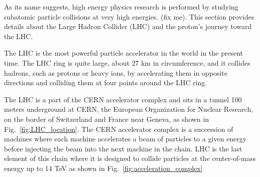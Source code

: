 
As its name suggests, high energy physics research is performed by studying subatomic particle collisions at very high energies. (fix me).
This section provides details about the Large Hadron Collider (LHC) and the proton's journey toward the LHC. %

The LHC is the most powerful particle accelerator in the world in the present time.
The LHC ring is quite large, about 27 km in circumference, and it collides hadrons, such as protons or heavy ions,
by accelerating them in opposite directions and colliding them at four points around the LHC ring.

The LHC is a part of the CERN accelerator complex and sits in a tunnel 100 meters underground at CERN, the European Organization for Nuclear Research, on the border of Switzerland and France near Geneva, as shown in Fig.~\ref{fig:LHC_location}. The CERN accelerator complex is a succession of machines where each machine accelerates a beam of particles to a given energy before injecting the beam into the next machine in the chain. LHC is the last element of this chain where it is designed to collide particles at the center-of-mass energy up to 14 TeV as shown in Fig.~\ref{fig:acceleration_complex}

